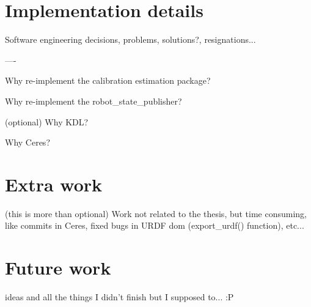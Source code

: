 \chapter{Implementation details}
\label{cha:implementation}

Software engineering decisions, problems, solutions?, resignations...


----

Why re-implement the calibration estimation package?

Why re-implement the robot\_state\_publisher?

(optional)
Why KDL?

Why Ceres?




\chapter{Extra work}
\label{cha:extra}

(this is more than optional)
Work not related to the thesis, but time consuming, like commits in Ceres, fixed bugs in URDF dom (export\_urdf() function), etc...



\chapter{Future work}
\label{cha:future}

ideas and all the things I didn't finish but I supposed to... :P
